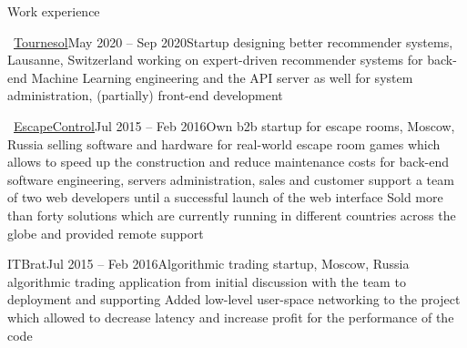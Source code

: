 \documentclass{resume} %
\newcommand{\mylink}{{\color{gray}\faExternalLink}}
\begin{document}
\begin{rSection}{Work experience}
	
	\begin{rSubsection}{\mylink~\href{http://tournesol.app}{Tournesol}}{May 2020 -- Sep 2020}{Startup designing better recommender systems, Lausanne, Switzerland}{}
		 working on expert-driven recommender systems
		 for back-end Machine Learning engineering and the API server
		 as well for system administration, (partially) front-end development
	\end{rSubsection}
	
	\begin{rSubsection}{\mylink~\href{http://escape-control.com}{EscapeControl}}{Jul 2015 -- Feb 2016}{Own b2b startup for escape rooms, Moscow, Russia}{}
		 selling software and hardware for real-world escape room games which allows to speed up the construction and reduce maintenance costs
		 for back-end software engineering, servers administration, sales and customer support
		 a team of two web developers until a successful launch of the web interface
		\myitem Sold more than forty solutions which are currently running in different countries across the globe and provided remote support
	\end{rSubsection}
	
	\begin{rSubsection}{ITBrat}{Jul 2015 -- Feb 2016}{Algorithmic trading startup, Moscow, Russia}{}
		 algorithmic trading application from initial discussion with the team to deployment and supporting
		\myitem Added low-level user-space networking to the project which allowed to decrease latency and increase profit
		 for the performance of the code
	\end{rSubsection}
	
	
\end{rSection}
\end{document}
